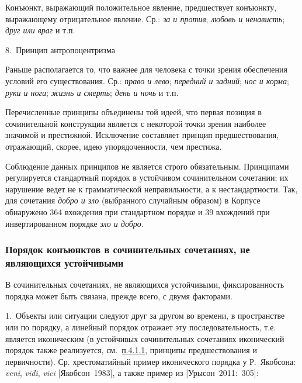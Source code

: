 Конъюнкт, выражающий положительное явление, предшествует конъюнкту,
выражающему отрицательное явление. Ср.: \textit{за и против}; \textit{любовь
  и ненависть}; \textit{друг или враг} и т.п.

8.~Принцип антропоцентризма

Раньше располагается то, что важнее для человека с точки зрения
обеспечения условий его существования. Ср.: \textit{право и лево};
\textit{передний и задний}; \textit{нос и корма}; \textit{руки и ноги};
\textit{жизнь и смерть}; \textit{день и ночь} и т.п.

Перечисленные принципы объединены той идеей, что первая позиция в
сочинительной конструкции является с некоторой точки зрения наиболее
значимой и престижной. Исключение составляет принцип предшествования,
отражающий, скорее, идею упорядоченности, чем престижа.

Соблюдение данных принципов не является строго обязательным. Принципами
регулируется стандартный порядок в устойчивом сочинительном сочетании;
их нарушение ведет не к грамматической неправильности, а к
нестандартности. Так, для сочетания \textit{добро и зло} (выбранного
случайным образом) в Корпусе обнаружено 364 вхождения при стандартном
порядке и 39 вхождений при инвертированном порядке \textit{зло и добро}.

\subsubsection{Порядок конъюнктов в сочинительных сочетаниях, не
  являющихся
  устойчивыми}\label{ux43fux43eux440ux44fux434ux43eux43a-ux43aux43eux43dux44aux44eux43dux43aux442ux43eux432-ux432-ux441ux43eux447ux438ux43dux438ux442ux435ux43bux44cux43dux44bux445-ux441ux43eux447ux435ux442ux430ux43dux438ux44fux445-ux43dux435-ux44fux432ux43bux44fux44eux449ux438ux445ux441ux44f-ux443ux441ux442ux43eux439ux447ux438ux432ux44bux43cux438}

В сочинительных сочетаниях, не являющихся устойчивыми, фиксированность
порядка может быть связана, прежде всего, с двумя факторами.

1.~Объекты или ситуации следуют друг за другом во времени, в
пространстве или по порядку, а линейный порядок отражает эту
последовательность, т.е. является иконическим (в устойчивых
сочинительных сочетаниях иконический порядок также реализуется,
см.~\underline{п.4.1.1}, принципы предшествования и первичности). Ср.
хрестоматийный пример иконического порядка у Р.~Якобсона: \textit{veni},
\textit{vidi}, \textit{vici} {[}Якобсон~1983{]}, а также пример из
{[}Урысон~2011:~305{]}:

